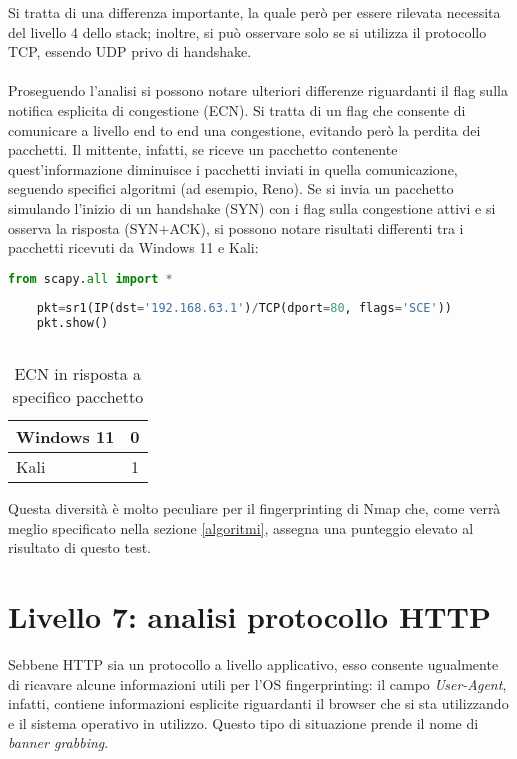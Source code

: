 Si tratta di una differenza importante, la quale però per essere rilevata necessita del livello 4 dello stack; inoltre, si può osservare solo se si utilizza il protocollo TCP, essendo UDP privo di handshake.
\\
\\
Proseguendo l'analisi si possono notare ulteriori differenze riguardanti il flag sulla notifica esplicita di congestione (ECN). Si tratta di un flag che consente di comunicare a livello end to end una congestione, evitando però la perdita dei pacchetti. Il mittente, infatti, se riceve un pacchetto contenente quest'informazione diminuisce i pacchetti inviati in quella comunicazione, seguendo specifici algoritmi (ad esempio, Reno). 
Se si invia un pacchetto simulando l'inizio di un handshake (SYN) con i flag sulla congestione attivi e si osserva la risposta (SYN+ACK), si possono notare risultati differenti tra i pacchetti ricevuti da Windows 11 e Kali:
\\
\begin{lstlisting}[language=Python, caption={Comando Python per l'invio del pacchetto}]
	from scapy.all import *
	
	pkt=sr1(IP(dst='192.168.63.1')/TCP(dport=80, flags='SCE'))
	pkt.show()
	
\end{lstlisting}

\begin{table}[h]
	\centering
	\begin{tabular}{| l | c |}
		\hline
		\rowcolor{blue!10} Windows 11 & 0
		\\
		\hline
		\rowcolor{red!10} Kali & 1
		\\
		\hline
		
	\end{tabular}
	\caption{ECN in risposta a specifico pacchetto}
	\label{tab:ECN}
\end{table}

Questa diversità è molto peculiare per il fingerprinting di Nmap che, come verrà meglio specificato nella sezione \ref{algoritmi}, assegna una punteggio elevato al risultato di questo test. 

\section{Livello 7: analisi protocollo HTTP}
Sebbene HTTP sia un protocollo a livello applicativo, esso consente ugualmente di ricavare alcune informazioni utili per l'OS fingerprinting: il campo \textit{User-Agent}, infatti, contiene informazioni esplicite riguardanti il browser che si sta utilizzando e il sistema operativo in utilizzo. Questo tipo di situazione prende il nome di \textit{banner grabbing}.

